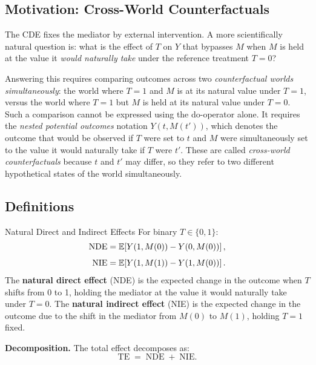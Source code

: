 \documentclass[master.tex]{subfiles}
\begin{document}
\subsection{Motivation: Cross-World Counterfactuals}

The CDE fixes the mediator by external intervention.  A more
scientifically natural question is: what is the effect of $T$ on $Y$
that bypasses $M$ when $M$ is held at the value it \emph{would
naturally take} under the reference treatment $T = 0$?

Answering this requires comparing outcomes across two
\emph{counterfactual worlds simultaneously}: the world where $T = 1$
and $M$ is at its natural value under $T = 1$, versus the world where
$T = 1$ but $M$ is held at its natural value under $T = 0$.  Such a
comparison cannot be expressed using the do-operator alone.  It
requires the \emph{nested potential outcomes} notation $Y(t, M(t'))$,
which denotes the outcome that would be observed if $T$ were set to $t$
and $M$ were simultaneously set to the value it would naturally take
if $T$ were $t'$.  These are called \emph{cross-world counterfactuals}
because $t$ and $t'$ may differ, so they refer to two different
hypothetical states of the world simultaneously.

\subsection{Definitions}

\begin{defn}{Natural Direct and Indirect Effects \citep{pearl2001direct}}
\label{w8:defn:nde-nie}
For binary $T \in \{0,1\}$:
\begin{align}
  \mathrm{NDE}
    &= \mathbb{E}\!\left[Y(1, M(0)) - Y(0, M(0))\right],
    \label{w8:eq:nde} \\[4pt]
  \mathrm{NIE}
    &= \mathbb{E}\!\left[Y(1, M(1)) - Y(1, M(0))\right].
    \label{w8:eq:nie}
\end{align}
The \textbf{natural direct effect} (NDE) is the expected change in the
outcome when $T$ shifts from 0 to 1, holding the mediator at the value
it would naturally take under $T = 0$.  The \textbf{natural indirect
effect} (NIE) is the expected change in the outcome due to the shift in
the mediator from $M(0)$ to $M(1)$, holding $T = 1$ fixed.
\end{defn}

\noindent\textbf{Decomposition.}  The total effect decomposes as:
\begin{equation}
  \mathrm{TE} \;=\; \mathrm{NDE} \;+\; \mathrm{NIE}.
  \label{w8:eq:decomp-natural}
\end{equation}
\end{document}
